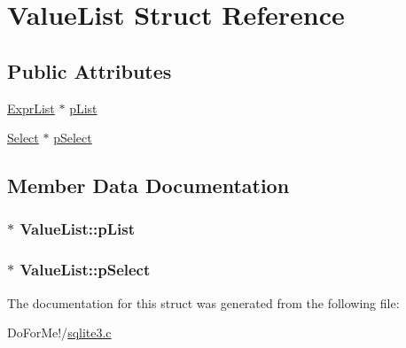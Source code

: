 \hypertarget{struct_value_list}{\section{Value\-List Struct Reference}
\label{struct_value_list}
}
\subsection*{Public Attributes}
\begin{DoxyCompactItemize}
\item 
\hyperlink{struct_expr_list}{Expr\-List} $\ast$ \hyperlink{struct_value_list_a6119dd8fd520ba00ebbe9425be94184b}{p\-List}
\item 
\hyperlink{struct_select}{Select} $\ast$ \hyperlink{struct_value_list_a1cce43c59968143faef1a9e457fad59a}{p\-Select}
\end{DoxyCompactItemize}


\subsection{Member Data Documentation}
\hypertarget{struct_value_list_a6119dd8fd520ba00ebbe9425be94184b}{
\subsubsection[{p\-List}]{$\ast$ Value\-List\-::p\-List}}\label{struct_value_list_a6119dd8fd520ba00ebbe9425be94184b}
\hypertarget{struct_value_list_a1cce43c59968143faef1a9e457fad59a}{
\subsubsection[{p\-Select}]{$\ast$ Value\-List\-::p\-Select}}\label{struct_value_list_a1cce43c59968143faef1a9e457fad59a}


The documentation for this struct was generated from the following file\-:\begin{DoxyCompactItemize}
\item 
Do\-For\-Me!/\hyperlink{sqlite3_8c}{sqlite3.\-c}\end{DoxyCompactItemize}
